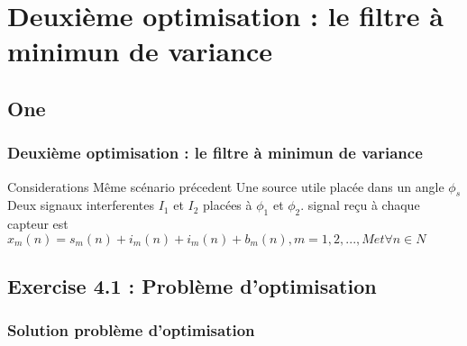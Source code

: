 \documentclass[11pt]{beamer}
\begin{document}
\section{Deuxième optimisation : le filtre à minimun de variance}
\begin{frame}
	\subsection{One}
	\frametitle{Deuxième optimisation : le filtre à minimun de variance}
	Considerations
 Même scénario précedent
 Une source utile placée dans un angle $\phi_s$
 Deux signaux interferentes $I_1$ et $I_2$ placées à $\phi_1$ et $\phi_2$.
 signal reçu à chaque capteur est $x_m(n) = s_m(n) + i_m(n) + i_m(n) + b_m(n), m = 1,2, ... , M et \forall n \in N$
	
\end{frame}
\subsection{Exercise 4.1 : Problème d'optimisation}
\begin{frame}

	\frametitle{Solution problème d'optimisation}
\end{frame}
\end{document}
